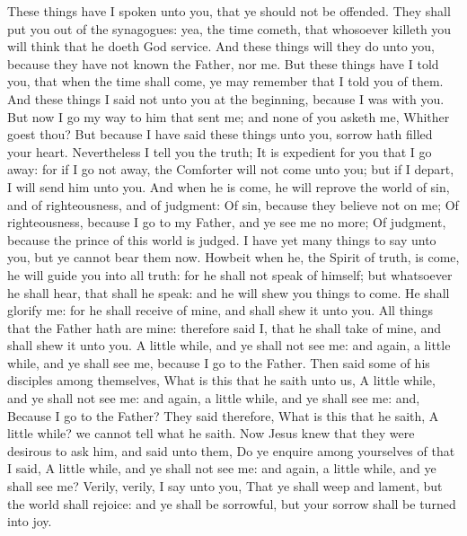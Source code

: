 These things have I spoken unto you, that ye should not be
offended.  They shall put you out of the synagogues: yea,
the time cometh, that whosoever killeth you will think that he doeth God
service.  And these things will they do unto you, because
they have not known the Father, nor me.  But these things
have I told you, that when the time shall come, ye may remember that I
told you of them. And these things I said not unto you at the beginning,
because I was with you.  But now I go my way to him that
sent me; and none of you asketh me, Whither goest thou?  But
because I have said these things unto you, sorrow hath filled your
heart.  Nevertheless I tell you the truth; It is expedient
for you that I go away: for if I go not away, the Comforter will not
come unto you; but if I depart, I will send him unto you. 
And when he is come, he will reprove the world of sin, and of
righteousness, and of judgment:  Of sin, because they
believe not on me;  Of righteousness, because I go to my
Father, and ye see me no more;  Of judgment, because the
prince of this world is judged.  I have yet many things to
say unto you, but ye cannot bear them now.  Howbeit when
he, the Spirit of truth, is come, he will guide you into all truth: for
he shall not speak of himself; but whatsoever he shall hear, that shall
he speak: and he will shew you things to come.  He shall
glorify me: for he shall receive of mine, and shall shew it unto you.
 All things that the Father hath are mine: therefore said
I, that he shall take of mine, and shall shew it unto you. 
A little while, and ye shall not see me: and again, a little while, and
ye shall see me, because I go to the Father.  Then said
some of his disciples among themselves, What is this that he saith unto
us, A little while, and ye shall not see me: and again, a little while,
and ye shall see me: and, Because I go to the Father?  They
said therefore, What is this that he saith, A little while? we cannot
tell what he saith.  Now Jesus knew that they were desirous
to ask him, and said unto them, Do ye enquire among yourselves of that I
said, A little while, and ye shall not see me: and again, a little
while, and ye shall see me?  Verily, verily, I say unto
you, That ye shall weep and lament, but the world shall rejoice: and ye
shall be sorrowful, but your sorrow shall be turned into joy.
